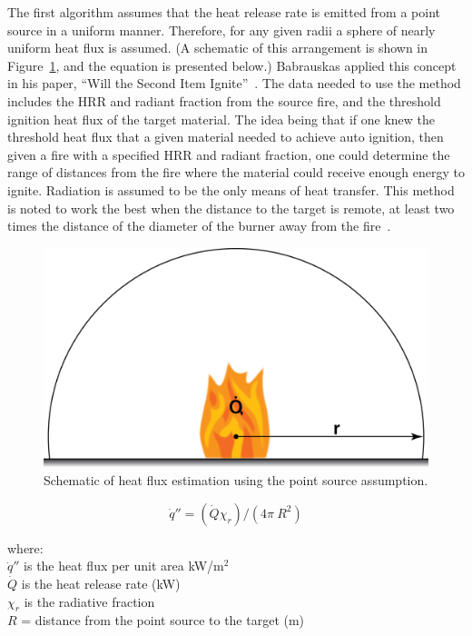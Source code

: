 \documentclass[twoside]{uocthesis}
\begin{document}
{The first algorithm assumes that the heat release rate is emitted from a point source in a uniform manner.  Therefore, for any given radii a sphere of nearly uniform heat flux is assumed. (A schematic of this arrangement is shown in Figure~\ref{PointSourceHF}, and the equation is presented below.) Babrauskas applied this concept in his paper, ``Will the Second Item Ignite''~\cite{Babrauskas:1981}.  The data needed to use the method includes the HRR and radiant fraction from the source fire, and the threshold ignition heat flux of the target material.  The idea being that if one knew the threshold heat flux that a given material needed to achieve auto ignition, then given a fire with a specified HRR and radiant fraction, one could determine the range of distances from the fire where the material could receive enough energy to ignite.  Radiation is assumed to be the only means of heat transfer.  This method is noted to work the best when the distance to the target is remote, at least two times the distance of the diameter of the burner away from the fire~\cite{Hamins:1991,Modak:1977}. 

\begin{figure}
	\centering
	\includegraphics[width=4.5in]{../Figures/PointSourceHF}
	\caption{Schematic of heat flux estimation using the point source assumption.}
	\label{PointSourceHF}
\end{figure}

\begin{equation} \label{eq:second_item}
\dot{q}'' = (\dot{Q} \chi_r)/(4 \pi\ R^2)
\end{equation}

\begin{tabbing}
where: \=  \\
{}
\> $\dot{q}''$ is the heat flux per unit area kW/m$^2$\\
\> $\dot{Q}$ is the heat release rate (kW) \\ 
\> $\chi_r$ is the radiative fraction \\
\> $R$ = distance from the point source to the target (m) \\
\end{tabbing}

}
\end{document}
